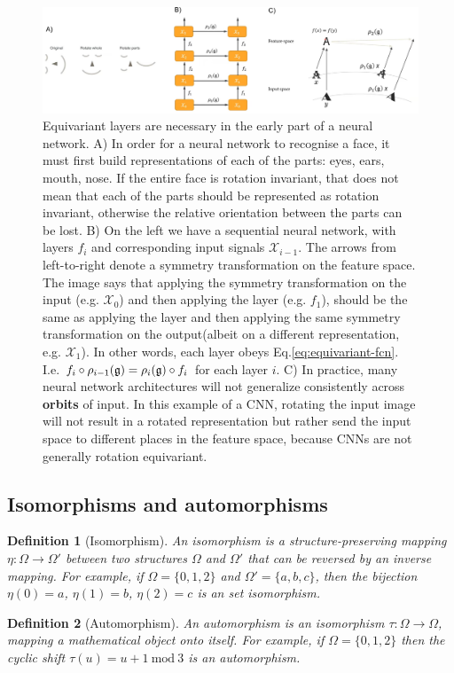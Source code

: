 \documentclass[11pt]{article}
\numberwithin{equation}{section}
\newtheorem{defn}{Definition}[section]
\begin{document}
\begin{figure}
\begin{center}
\includegraphics[width=\columnwidth]{../figures/invariance-equivariance.png}  
\end{center}
\caption{Equivariant layers are necessary in the early part of a neural network. A) In order for a neural network to recognise a face, it must first build representations of each of the parts: eyes, ears, mouth, nose. If the entire face is rotation invariant, that does not mean that each of the parts should be represented as rotation invariant, otherwise the relative orientation between the parts can be lost. B) On the left we have a sequential neural network, with layers $f_i$ and corresponding input signals $\mathcal{X}_{i-1}$. The arrows from left-to-right denote a symmetry transformation on the feature space. The image says that applying the symmetry transformation on the input (e.g. $\mathcal{X}_0$) and then applying the layer (e.g. $f_1$), should be the same as applying the layer and then applying the same symmetry transformation on the output(albeit on a different representation, e.g. $\mathcal{X}_1$). In other words, each layer obeys Eq.\eqref{eq:equivariant-fcn}. I.e. $f_i \circ \rho_{i-1}(\mathfrak{g}) = \rho_i(\mathfrak{g}) \circ f_i$ for each layer $i$. C) In practice, many neural network architectures will not generalize consistently across \textbf{orbits} of input. In this example of a CNN, rotating the input image will not result in a rotated representation but rather send the input space to different places in the feature space, because CNNs are not generally rotation equivariant.
}
\label{fig:invariance-equivariance}
\end{figure}

\subsection{Isomorphisms and automorphisms}

\begin{defn}[Isomorphism]
An isomorphism is a structure-preserving mapping $\eta: \Omega \rightarrow \Omega'$ between two structures $\Omega$ and $\Omega'$ that can be reversed by an inverse mapping. For example, if $\Omega = \{0,1,2\}$ and $\Omega' = \{a, b, c\}$, then the bijection $\eta(0)=a$, $\eta(1)=b$, $\eta(2)=c$ is an set isomorphism.
\end{defn}

\begin{defn}[Automorphism]
An automorphism is an isomorphism $\tau : \Omega \rightarrow \Omega$, mapping a mathematical object onto itself. For example, if $\Omega = \{0,1,2\}$ then the cyclic shift $\tau(u) = u + 1\ \text{mod}\ 3$ is an automorphism.
\end{defn}

\newpage
 
\end{document}
